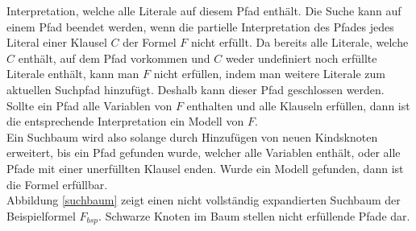 Interpretation, welche alle Literale auf diesem Pfad enthält. Die Suche
kann auf einem Pfad beendet werden, wenn die partielle Interpretation 
des Pfades jedes Literal einer Klausel $C$ der Formel $F$ nicht erfüllt. Da bereits alle
Literale, welche $C$ enthält, auf dem Pfad vorkommen und $C$ weder
undefiniert noch erfüllte Literale enthält, kann man $F$ nicht erfüllen,
indem man weitere Literale zum aktuellen Suchpfad hinzufügt. Deshalb
kann dieser Pfad geschlossen werden. Sollte ein Pfad alle
Variablen von $F$ enthalten und alle Klauseln erfüllen,
dann ist die entsprechende Interpretation ein Modell
von $F$.\\
Ein Suchbaum wird also solange durch Hinzufügen
von neuen Kindsknoten erweitert, bis ein Pfad gefunden wurde, welcher
alle Variablen enthält, oder alle Pfade mit einer
unerfüllten Klausel enden. Wurde ein Modell gefunden, dann ist
die Formel erfüllbar.\\
Abbildung \ref{suchbaum} zeigt einen nicht vollständig expandierten
Suchbaum der Beispielformel $F_{bsp}$. Schwarze Knoten im Baum 
stellen nicht erfüllende Pfade dar.

